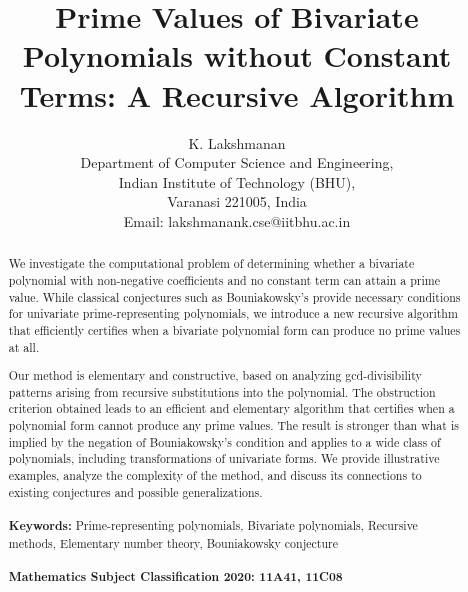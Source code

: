 \documentclass[a4paper,11pt]{article}
\begin{document}
	
	
	\title{Prime Values of Bivariate Polynomials without Constant Terms: A Recursive Algorithm}
		
	\author{K. Lakshmanan \\
		Department of Computer Science and Engineering, \\ Indian Institute of Technology (BHU),\\
		Varanasi 221005, India\\
		Email: lakshmanank.cse@iitbhu.ac.in}
	
	\date{}
	
	\maketitle
	
	\begin{abstract}
		We investigate the computational problem of determining whether a bivariate polynomial with non-negative coefficients and no constant term can attain a prime value. While classical conjectures such as Bouniakowsky's provide necessary conditions for univariate prime-representing polynomials, we introduce a new recursive algorithm that efficiently certifies when a bivariate polynomial form can produce no prime values at all.
		
		Our method is elementary and constructive, based on analyzing gcd-divisibility patterns arising from recursive substitutions into the polynomial. The obstruction criterion obtained leads to an efficient and elementary algorithm that certifies when a polynomial form cannot produce any prime values. The result is stronger than what is implied by the negation of Bouniakowsky’s condition and applies to a wide class of polynomials, including transformations of univariate forms. We provide illustrative examples, analyze the complexity of the method, and discuss its connections to existing conjectures and possible generalizations.\\
		\\
		\textbf{Keywords: } Prime-representing polynomials, Bivariate polynomials, Recursive methods, Elementary number theory, Bouniakowsky conjecture \\
		\\
		\textbf{Mathematics Subject Classification 2020:	11A41, 11C08}
	\end{abstract}



\end{document}
